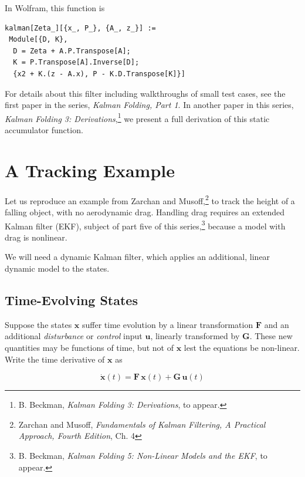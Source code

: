 \documentclass[10pt,oneside,x11names]{article}
\begin{document}
In Wolfram, this function is

\begin{verbatim}
kalman[Zeta_][{x_, P_}, {A_, z_}] :=
 Module[{D, K},
  D = Zeta + A.P.Transpose[A];
  K = P.Transpose[A].Inverse[D];
  {x2 + K.(z - A.x), P - K.D.Transpose[K]}]
\end{verbatim}

For details about this filter including walkthroughs of small test cases, see the first
paper in the series, \emph{Kalman Folding, Part 1}.\footnotemark[1]{}
In another paper in this series, \emph{Kalman Folding 3: Derivations},\footnote{B. Beckman, \emph{Kalman Folding 3: Derivations}, to appear.} we
present a full derivation of this static accumulator function.

\section{A Tracking Example}
\label{sec:orgheadline7}

Let us reproduce an example from Zarchan and Musoff,\footnote{Zarchan and Musoff, \emph{Fundamentals of Kalman Filtering, A Practical
Approach, Fourth Edition}, Ch. 4} to track the
height of a falling object, with no aerodynamic drag. Handling drag requires an
extended Kalman filter (EKF), subject of part five of this series,\footnote{B. Beckman, \emph{Kalman Folding 5: Non-Linear Models and the EKF}, to appear.}
because a model with drag is nonlinear.

We will need a dynamic Kalman filter, which applies an additional, linear
dynamic model to the states. 

\subsection{Time-Evolving States}
\label{sec:orgheadline3}

Suppose the states \(\mathbold{x}\) suffer time evolution by a linear
transformation \(\mathbold{F}\) and an additional \emph{disturbance} or \emph{control} input
\(\mathbold{u}\), linearly transformed by \(\mathbold{G}\).
These new quantities may
be functions of time, but not of \(\mathbold{x}\) lest the equations be
non-linear. Write
the time derivative of \(\mathbold{x}\) as

\begin{equation*}
{\dot{\mathbold{x}}}(t)=\mathbold{F}\,\mathbold{x}(t)+\mathbold{G}\,\mathbold{u}(t)
\end{equation*}
\end{document}
